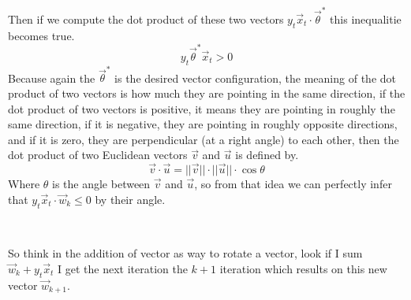 Then if we compute
the dot product of these two vectors $y_t\vec{x}_t \cdot \vec{\theta}^*$ this inequalitie
becomes true.
\[
  y_t\vec{\theta}^*\vec{x}_t > 0
\]
Because again the $\vec{\theta}^*$ is the desired vector configuration, the meaning of the dot product
of two vectors is how much they are pointing in the same direction,
if the dot product of two vectors is positive, it means they are pointing in
roughly the same direction, if it is negative, they are pointing in roughly opposite
directions, and if it is zero, they are perpendicular (at a right angle) to each other,
then the dot product of two Euclidean vectors $\vec{v}$ and $\vec{u}$ is defined by.
\[
  \vec{v} \cdot \vec{u} = ||\vec{v}|| \cdot ||\vec{u}|| \cdot \cos{\theta}
\]
Where $\theta$ is the angle between $\vec{v}$ and $\vec{u}$, so
from that idea we can perfectly infer that $y_t\vec{x}_t \cdot \vec{w}_k \le 0$ by their angle.\\
\begin{center}
 \\
\end{center}
So think in the addition of vector as way to rotate a vector, look if I sum $\vec{w}_k + y_t\vec{x}_t$
I get the next iteration the $k + 1$ iteration which results on this new vector $\vec{w}_{k + 1}$.
\begin{center}
 \\
\end{center}
